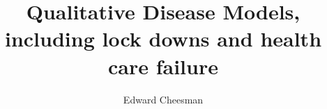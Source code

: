 \documentclass[a4paper]{article}
\begin{document}
	\title{Qualitative Disease Models, including lock downs and health care failure}
	\author{Edward Cheesman}
	\date{}
	\maketitle
	\tableofcontents
	
	
	
\end{document}
